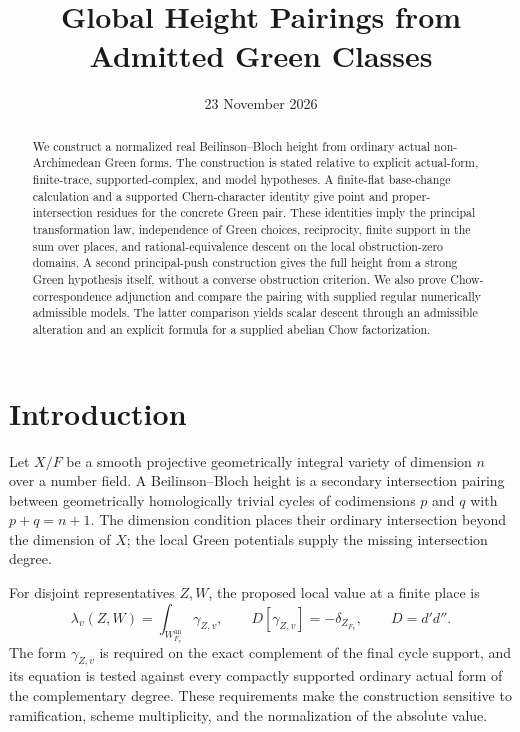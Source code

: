\documentclass[11pt,a4paper]{article}
\title{Global Height Pairings from Admitted Green Classes}
\author{}
\date{23 November 2026}
\theoremstyle{definition}
\theoremstyle{remark}
\numberwithin{equation}{section}
\newcommand{\an}{\mathrm{an}}
\begin{document}
\maketitle
\begin{abstract}
We construct a normalized real Beilinson--Bloch height from ordinary actual non-Archimedean Green forms. The construction is stated relative to explicit actual-form, finite-trace, supported-complex, and model hypotheses. A finite-flat base-change calculation and a supported Chern-character identity give point and proper-intersection residues for the concrete Green pair. These identities imply the principal transformation law, independence of Green choices, reciprocity, finite support in the sum over places, and rational-equivalence descent on the local obstruction-zero domains. A second principal-push construction gives the full height from a strong Green hypothesis itself, without a converse obstruction criterion. We also prove Chow-correspondence adjunction and compare the pairing with supplied regular numerically admissible models. The latter comparison yields scalar descent through an admissible alteration and an explicit formula for a supplied abelian Chow factorization.
\end{abstract}

\tableofcontents

\section{Introduction}\label{sec:height-introduction}

Let $X/F$ be a smooth projective geometrically integral variety of dimension $n$ over a number field. A Beilinson--Bloch height is a secondary intersection pairing between geometrically homologically trivial cycles of codimensions $p$ and $q$ with $p+q=n+1$. The dimension condition places their ordinary intersection beyond the dimension of $X$; the local Green potentials supply the missing intersection degree.

For disjoint representatives $Z,W$, the proposed local value at a finite place is
\[
 \lambda_v(Z,W)=\int_{W_{F_v}^{\an}}\gamma_{Z,v},
 \qquad D[\gamma_{Z,v}]=-\delta_{Z_{F_v}},\qquad D=d'd''.
\]
The form $\gamma_{Z,v}$ is required on the exact complement of the final cycle support, and its equation is tested against every compactly supported ordinary actual form of the complementary degree. These requirements make the construction sensitive to ramification, scheme multiplicity, and the normalization of the absolute value.
\end{document}
